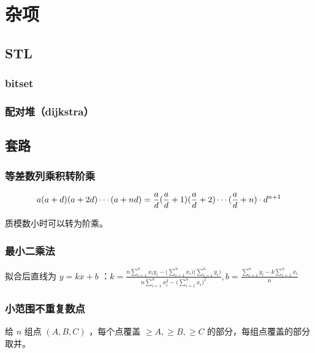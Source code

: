 \section{杂项}

\subsection{STL}

\subsubsection{bitset}



\subsubsection{配对堆（dijkstra）}



\newpage

\subsection{套路}

\subsubsection{等差数列乘积转阶乘}

$$
a(a+d)(a+2d)\cdots(a+nd)={a\over d}({a\over d}+1)({a\over d}+2)\cdots({a\over d}+n)\cdot d^{n+1}
$$

质模数小时可以转为阶乘。

\subsubsection{最小二乘法}

拟合后直线为 $y=kx+b$ ：$k = \displaystyle\frac{n\sum_{i=1}^n x_iy_i - \big(\sum_{i=1}^n x_i \big)\big(\sum_{i=1}^n y_i\big)}{n\sum_{i=1}^n x_i^2 - \big(\sum_{i=1}^{n} x_i\big)^2}, b = \displaystyle\frac{\sum_{i=1}^{n} y_i - k\sum_{i=1}^n x_i}{n}$


\subsubsection{小范围不重复数点}

给 $n$ 组点 $(A,B,C)$ ，每个点覆盖 $\ge A,\ge B,\ge C$ 的部分，每组点覆盖的部分取并。

